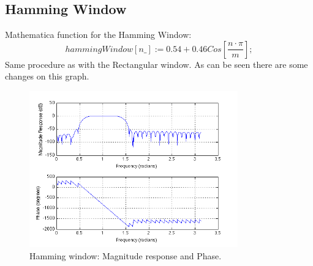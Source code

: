 \documentclass[a4wide,10pt]{article}
\begin{document}
		\subsection{Hamming Window} %
		\label{sub:hamming_window}
			Mathematica function for the Hamming Window:
			\begin{equation}
				hammingWindow[n\_] := 0.54 + 0.46 Cos[\frac{n\cdot \pi}{m}]; \nonumber
			\end{equation}
			Same procedure as with the Rectangular window. As can be seen there are some changes on this graph.
			\begin{figure}[h]
				\centering
					\includegraphics[width=9cm]{images/opgave_2_b.png}
				\caption{Hamming window: Magnitude response and Phase.}
				\label{fig:images_opgave_2_b}
			\end{figure}
			
		
\newpage
\end{document}
